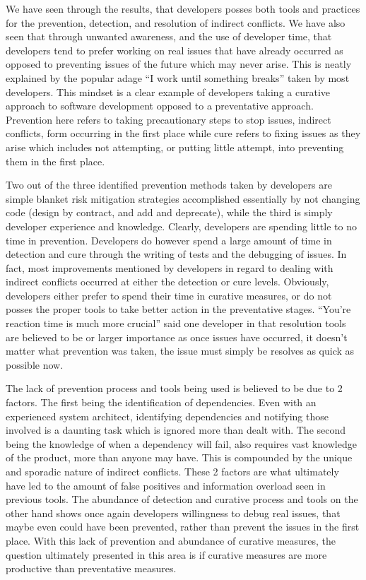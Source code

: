 We have seen through the results, that developers posses both tools and practices for the prevention,
detection, and resolution of indirect conflicts. We have also seen that through unwanted awareness, and the use of developer time,
that developers tend to prefer working on real issues that have already occurred as opposed to preventing issues of the future which
may never arise. This is neatly explained by the popular adage ``I work until something breaks'' taken by most developers. This mindset
is a clear example of developers taking a curative approach to software development opposed to a preventative approach.
Prevention here refers to taking precautionary steps to stop issues, indirect conflicts, form occurring in the first
place while cure refers to fixing issues as they arise which includes not attempting, or putting little attempt, into preventing
them in the first place.

Two out of the three identified prevention methods taken by developers are simple blanket risk mitigation strategies
accomplished essentially by
not changing code (design by contract, and add and deprecate), while the third is simply developer experience and knowledge. Clearly,
developers are spending little to no time in prevention. Developers do however spend a large amount of time in detection and cure through the
writing of tests and the debugging of issues. In fact, most improvements mentioned by developers in regard to dealing with indirect
conflicts occurred at either the detection or cure levels. Obviously, developers either prefer to spend their time in curative
measures, or do not posses the proper tools to take better action in the preventative stages. ``You're reaction time is much more crucial''
said one developer in that resolution tools are believed to be or larger importance as once issues have occurred, it doesn't
matter what prevention was taken, the issue must simply be resolves as quick as possible now.

The lack of prevention process and tools being used is believed to be due to 2 factors. The first being the identification of dependencies.
Even with an experienced system architect, identifying dependencies and notifying those involved is a daunting task 
which is ignored more than dealt with. The second being the knowledge of when a dependency will fail, also requires vast knowledge
of the product, more than anyone may have. This is compounded by the unique and sporadic nature of indirect conflicts. These 2 factors
are what ultimately have led to the amount of false positives and information overload seen in previous tools. The
abundance of detection and curative process and tools on the other hand shows once again developers willingness to debug
real issues, that maybe even could have been prevented, rather than prevent the issues in the first place. With
this lack of prevention and abundance of curative measures, the question ultimately presented in this area is if 
curative measures are more productive than preventative measures.

